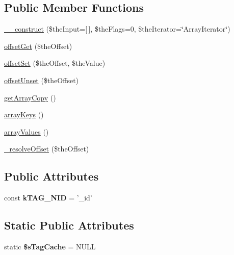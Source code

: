 \subsection*{Public Member Functions}
\begin{DoxyCompactItemize}
\item 
\hyperlink{class_ontology_wrapper_1_1_document_object_a6d2076d551d0b7035a279bb89db26bd7}{\-\_\-\-\_\-construct} (\$the\-Input=\mbox{[}$\,$\mbox{]}, \$the\-Flags=0, \$the\-Iterator=\char`\"{}Array\-Iterator\char`\"{})
\item 
\hyperlink{class_ontology_wrapper_1_1_document_object_a034f55170eb880dd210f0c9ab15233bc}{offset\-Get} (\$the\-Offset)
\item 
\hyperlink{class_ontology_wrapper_1_1_document_object_aa2e3a251dd102f8aba0645b405a16053}{offset\-Set} (\$the\-Offset, \$the\-Value)
\item 
\hyperlink{class_ontology_wrapper_1_1_document_object_a834adbf7c1f027c3f817dbcf4f12de2d}{offset\-Unset} (\$the\-Offset)
\item 
\hyperlink{class_ontology_wrapper_1_1_document_object_a1d497371592ce2600533565cfaae91b8}{get\-Array\-Copy} ()
\item 
\hyperlink{class_ontology_wrapper_1_1_document_object_a4a96a40abe667d9c3ac7a5d5675dece5}{array\-Keys} ()
\item 
\hyperlink{class_ontology_wrapper_1_1_document_object_ab8e04acc8c14acbeae6d530a604b676a}{array\-Values} ()
\item 
\hyperlink{class_ontology_wrapper_1_1_document_object_a685ca256ab347244104f444cc38362e5}{\-\_\-resolve\-Offset} (\$the\-Offset)
\end{DoxyCompactItemize}
\subsection*{Public Attributes}
\begin{DoxyCompactItemize}
\item 
\hypertarget{class_ontology_wrapper_1_1_document_object_a7bc4d58386184b8f007ad83c6d86e52b}{const {\bfseries k\-T\-A\-G\-\_\-\-N\-I\-D} = '\-\_\-id'}\label{class_ontology_wrapper_1_1_document_object_a7bc4d58386184b8f007ad83c6d86e52b}

\end{DoxyCompactItemize}
\subsection*{Static Public Attributes}
\begin{DoxyCompactItemize}
\item 
\hypertarget{class_ontology_wrapper_1_1_document_object_afd8a2bd1ce090ac17bfe79fc0e596c96}{static {\bfseries \$s\-Tag\-Cache} = N\-U\-L\-L}\label{class_ontology_wrapper_1_1_document_object_afd8a2bd1ce090ac17bfe79fc0e596c96}

\end{DoxyCompactItemize}


